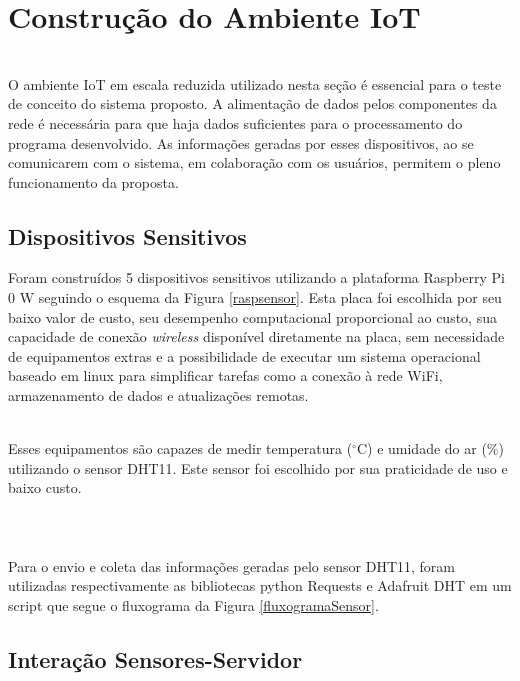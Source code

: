 \section{Construção do Ambiente IoT}
\label{sec:ambiente}
\\\null \quad O ambiente \acrshort{IoT} em escala reduzida utilizado nesta seção é essencial para o teste de conceito
do sistema proposto. A alimentação de dados pelos componentes da rede é necessária para que haja
dados suficientes para o processamento do programa desenvolvido. As informações geradas por esses dispositivos, ao se comunicarem com o sistema, em colaboração
com os usuários, permitem o pleno funcionamento da proposta.

\subsection{Dispositivos Sensitivos}
\quad Foram construídos 5 dispositivos sensitivos utilizando a plataforma Raspberry Pi 0 W seguindo o esquema da Figura \ref{raspsensor}. Esta placa
foi escolhida por seu baixo valor de custo, seu desempenho computacional proporcional ao custo, sua capacidade de conexão \textit{wireless} disponível diretamente na placa, sem necessidade de equipamentos extras e a possibilidade de executar um sistema operacional baseado em linux para simplificar tarefas como a conexão à rede WiFi, armazenamento de dados e atualizações remotas.

\\\null \quad Esses equipamentos são capazes de medir temperatura ($^\circ$C) e umidade do ar (\%) utilizando o sensor DHT11. Este sensor foi escolhido
por sua praticidade de uso e baixo custo.
\\\\\\
\\\null \quad Para o envio e coleta das informações geradas pelo sensor DHT11, foram utilizadas respectivamente as bibliotecas python Requests \cite{Requests} e Adafruit DHT \cite{AdafruitDHT} em um script que segue o fluxograma da Figura \ref{fluxogramaSensor}.

\newpage
\subsection{Interação Sensores-Servidor}

